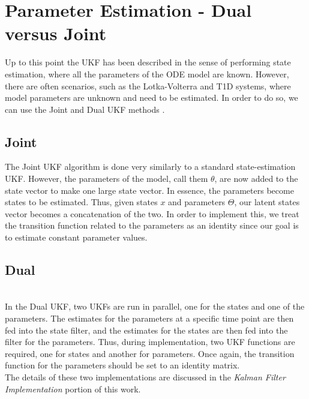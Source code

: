\documentclass{article}
\begin{document}
    
\section{Parameter Estimation - Dual versus Joint}
Up to this point the UKF has been described in the sense of performing state estimation, where all the parameters of the ODE model are known. However, there are often scenarios, such as the Lotka-Volterra and T1D systems, where model parameters are unknown and need to be estimated. In order to do so, we can use the Joint and Dual UKF methods \cite{VanMereChapter}.

    \subsection{Joint}
    The Joint UKF algorithm is done very similarly to a standard state-estimation UKF. However, the parameters of the model, call them $\theta$, are now added to the state vector to make one large state vector. In essence, the parameters become states to be estimated. Thus, given states $x$ and parameters $\Theta$, our latent states vector becomes a concatenation of the two. In order to implement this, we treat the transition function related to the parameters as an identity since our goal is to estimate constant parameter values.
    
    \subsection{Dual}\\
    In the Dual UKF, two UKFs are run in parallel, one for the states and one of the parameters. The estimates for the parameters at a specific time point are then fed into the state filter, and the estimates for the states are then fed into the filter for the parameters. Thus, during implementation, two UKF functions are required, one for states and another for parameters. Once again, the transition function for the parameters should be set to an identity matrix.\\

The details of these two implementations are discussed in the \emph{Kalman Filter Implementation} portion of this work.
    
    
    
    
\end{document}
